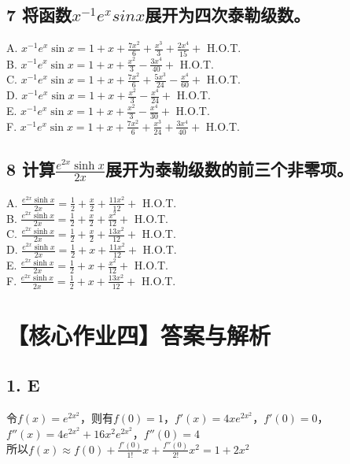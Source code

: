 \documentclass[a5paper, 11pt]{article}
\begin{document}
\subsection*{7 \K 将函数$x^{-1}e^x sin x$展开为四次泰勒级数。}
A. $x^{-1} e^x \sin x = 1 + x + \frac{7x^2}{6} + \frac{x^3}{3} + \frac{2x^4}{15} +$ H.O.T. \\
B. $x^{-1} e^x \sin x = 1 + x + \frac{x^2}{3} - \frac{3x^4}{40} +$ H.O.T. \\
C. $x^{-1} e^x \sin x = 1 + x + \frac{7x^2}{6} + \frac{5x^3}{24} - \frac{x^4}{60} +$ H.O.T. \\
D. $x^{-1} e^x \sin x = 1 + x + \frac{x^2}{3} - \frac{x^4}{24} +$ H.O.T. \\
E. $x^{-1} e^x \sin x = 1 + x + \frac{x^2}{3} - \frac{x^4}{30} +$ H.O.T. \\
F. $x^{-1} e^x \sin x = 1 + x + \frac{7x^2}{6} + \frac{x^3}{24} + \frac{3x^4}{40} +$ H.O.T. \\

\subsection*{8 \K 计算$\frac{e^{2x} \sinh x}{2x}$展开为泰勒级数的前三个非零项。}
A. $\frac{e^{2x} \sinh x}{2x} = \frac{1}{2} + \frac{x}{2} +  \frac{11x^2}{12} +$ H.O.T. \\
B. $\frac{e^{2x} \sinh x}{2x} = \frac{1}{2} + \frac{x}{2} +  \frac{x^2}{12} +$ H.O.T. \\
C. $\frac{e^{2x} \sinh x}{2x} = \frac{1}{2} + \frac{x}{2} +  \frac{13x^2}{12} +$ H.O.T. \\
D. $\frac{e^{2x} \sinh x}{2x} = \frac{1}{2} + x +  \frac{11x^2}{12} +$ H.O.T. \\
E. $\frac{e^{2x} \sinh x}{2x} = \frac{1}{2} + x +  \frac{x^2}{12} +$ H.O.T. \\
F. $\frac{e^{2x} \sinh x}{2x} = \frac{1}{2} + x +  \frac{13x^2}{12} +$ H.O.T. \\

\clearpage
\section*{【核心作业四】答案与解析}
\subsection*{1. E}
令$f(x) = e^{2x^2}$，则有$f(0) = 1$，$f'(x) = 4x e^{2x^2}$，$f'(0)=0$，$f''(x) = 4 e^{2x^2} + 16x^2 e^{2x^2}$，$f''(0) = 4$\\
所以$f(x)\approx f(0) + \frac{f'(0)}{1!} x+ \frac{f''(0)}{2!} x^2= 1 + 2x^2$
\end{document}
